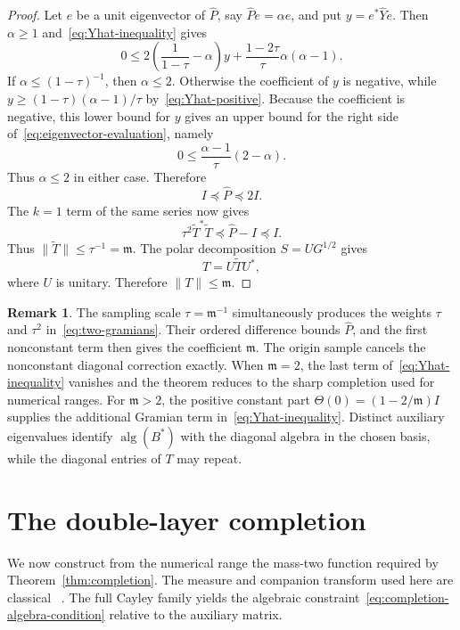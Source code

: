 \documentclass[preprints,article,submit,oneauthor]{Definitions/mdpi}
\newcounter{manuscriptresult}[section]
\theoremstyle{mdpi}
\theoremstyle{definition}
\newtheorem{remark}[manuscriptresult]{Remark}
\newcommand{\alg}{\operatorname{alg}}
\begin{document}
\begin{proof}
Let $e$ be a unit eigenvector of $\widehat P$, say
$\widehat Pe=\alpha e$, and put $y=e^*\widehat Ye$.  Then
$\alpha\geq1$ and~\eqref{eq:Yhat-inequality} gives
\begin{equation}
  0\leq2\left(\frac1{1-\tau}-\alpha\right)y
  +\frac{1-2\tau}{\tau}\alpha(\alpha-1).
  \label{eq:eigenvector-evaluation}
\end{equation}
If $\alpha\leq(1-\tau)^{-1}$, then $\alpha\leq2$.  Otherwise the
coefficient of $y$ is negative, while
$y\geq(1-\tau)(\alpha-1)/\tau$ by~\eqref{eq:Yhat-positive}.  Because the
coefficient is negative, this lower bound for $y$ gives an upper bound
for the right side of~\eqref{eq:eigenvector-evaluation}, namely
\[
  0\leq\frac{\alpha-1}{\tau}(2-\alpha).
\]
Thus $\alpha\leq2$ in either case.  Therefore
\begin{equation}
  I\preceq\widehat P\preceq2I.
  \label{eq:Phat-bounds}
\end{equation}
The $k=1$ term of the same series now gives
\[
  \tau^2\widetilde T^*\widetilde T
  \preceq\widehat P-I\preceq I.
\]
Thus $\lVert\widetilde T\rVert\leq\tau^{-1}=\mathfrak m$.  The polar
decomposition
$S=UG^{1/2}$ gives
\[
  T=U\widetilde TU^*,
\]
where $U$ is unitary.  Therefore
$\lVert T\rVert\leq\mathfrak m$.
\end{proof}

\begin{remark}
\label{rem:completion-novelty}
The sampling scale $\tau=\mathfrak m^{-1}$ simultaneously produces the
weights $\tau$ and $\tau^2$ in~\eqref{eq:two-gramians}.  Their ordered
difference bounds $\widehat P$, and the first nonconstant term then
gives the coefficient $\mathfrak m$.  The origin sample cancels the
nonconstant diagonal correction exactly.  When $\mathfrak m=2$, the
last term of~\eqref{eq:Yhat-inequality} vanishes and the theorem
reduces to the sharp completion used for numerical ranges.  For
$\mathfrak m>2$, the positive constant part
$\Theta(0)=(1-2/\mathfrak m)I$ supplies the additional Gramian term
in~\eqref{eq:Yhat-inequality}.
Distinct auxiliary eigenvalues identify $\alg(B^*)$ with the diagonal
algebra in the chosen basis, while the diagonal entries of $T$ may
repeat.
\end{remark}

\section{The double-layer completion}
\label{sec:double-layer}

We now construct from the numerical range the mass-two function
required by Theorem~\ref{thm:completion}.  The measure and companion
transform used here are classical~%
\cite{DelyonDelyon1999,Crouzeix2007,CrouzeixPalencia2017}.  The full
Cayley family yields the algebraic
constraint~\eqref{eq:completion-algebra-condition} relative to the
auxiliary matrix.
\end{document}

